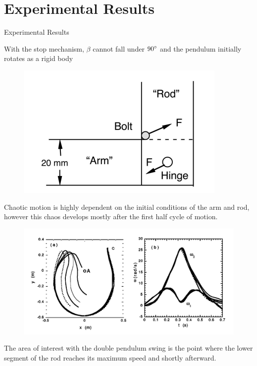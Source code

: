 \documentclass[tikz]{beamer}
\begin{document}
\section{Experimental Results}
\begin{frame} {Experimental Results}
	
	 {
		With the stop mechanism, $\beta$ cannot fall under $90 \degree$ and the pendulum initially rotates as a rigid body
		\begin{figure}
			\centering
			\includegraphics[scale=0.5]{stopmechanism.png}
		\end{figure}
	}

	 {
		Chaotic motion is highly dependent on the initial conditions of the arm and rod, however this chaos develops mostly after the first half cycle of motion.
		\begin{figure}
			\centering
			\includegraphics[scale=0.5]{trajectory.png}
		\end{figure}

		The area of interest with the double pendulum swing is the point where the lower segment of the rod reaches its maximum speed and shortly afterward.
	}


\end{frame}
\end{document}
